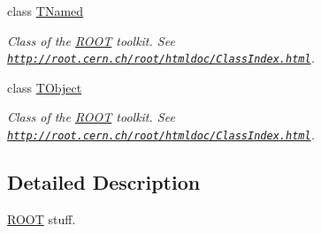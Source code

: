\begin{DoxyCompactItemize}
class \hyperlink{class_t_named}{T\+Named}
\begin{DoxyCompactList}\small\item\em Class of the \hyperlink{namespace_r_o_o_t}{R\+O\+OT} toolkit. See \href{http://root.cern.ch/root/htmldoc/ClassIndex.html}{\tt http\+://root.\+cern.\+ch/root/htmldoc/\+Class\+Index.\+html}. \end{DoxyCompactList}\item 
class \hyperlink{class_t_object}{T\+Object}
\begin{DoxyCompactList}\small\item\em Class of the \hyperlink{namespace_r_o_o_t}{R\+O\+OT} toolkit. See \href{http://root.cern.ch/root/htmldoc/ClassIndex.html}{\tt http\+://root.\+cern.\+ch/root/htmldoc/\+Class\+Index.\+html}. \end{DoxyCompactList}\end{DoxyCompactItemize}


\subsection{Detailed Description}
\hyperlink{namespace_r_o_o_t}{R\+O\+OT} stuff. 

